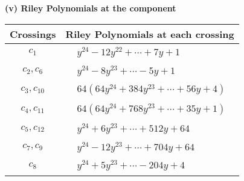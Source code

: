 \documentclass[1p]{elsarticle_modified}
\theoremstyle{definition}
\begin{document}
\newpage\renewcommand{\arraystretch}{1}
\flushleft \textbf{(v) Riley Polynomials at the component}\newline \\
\begin{tabular}{m{50pt}|m{274pt}}
Crossings & \hspace{64pt}Riley Polynomials at each crossing \\
\hline $$\begin{aligned}c_{1}\end{aligned}$$&$\begin{aligned}
&y^{24}-12 y^{22}+\cdots+7 y+1
\end{aligned}$\\
\hline $$\begin{aligned}c_{2},c_{6}\end{aligned}$$&$\begin{aligned}
&y^{24}-8 y^{23}+\cdots-5 y+1
\end{aligned}$\\
\hline $$\begin{aligned}c_{3},c_{10}\end{aligned}$$&$\begin{aligned}
&64(64 y^{24}+384 y^{23}+\cdots+56 y+4)
\end{aligned}$\\
\hline $$\begin{aligned}c_{4},c_{11}\end{aligned}$$&$\begin{aligned}
&64(64 y^{24}+768 y^{23}+\cdots+35 y+1)
\end{aligned}$\\
\hline $$\begin{aligned}c_{5},c_{12}\end{aligned}$$&$\begin{aligned}
&y^{24}+6 y^{23}+\cdots+512 y+64
\end{aligned}$\\
\hline $$\begin{aligned}c_{7},c_{9}\end{aligned}$$&$\begin{aligned}
&y^{24}-12 y^{23}+\cdots+704 y+64
\end{aligned}$\\
\hline $$\begin{aligned}c_{8}\end{aligned}$$&$\begin{aligned}
&y^{24}+5 y^{23}+\cdots-204 y+4
\end{aligned}$\\
\hline
\end{tabular}\\~\\
\end{document}
